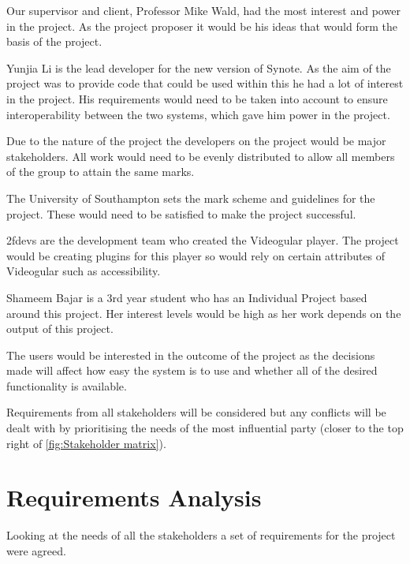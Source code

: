 Our supervisor and client, Professor Mike Wald, had the most interest and power in the project. As the project proposer it would be his ideas that would form the basis of the project.

Yunjia Li is the lead developer for the new version of Synote. As the aim of the project was to provide code that could be used within this he had a lot of interest in the project. His requirements would need to be taken into account to ensure interoperability between the two systems, which gave him power in the project.

Due to the nature of the project the developers on the project would be major stakeholders. All work would need to be evenly distributed to allow all members of the group to attain the same marks.

The University of Southampton sets the mark scheme and guidelines for the project. These would need to be satisfied to make the project successful.

2fdevs are the development team who created the \gls{Videogular} player. The project would be creating plugins for this player so would rely on certain attributes of \gls{Videogular} such as accessibility. 

Shameem Bajar is a 3rd year student who has an Individual Project based around this project. Her interest levels would be high as her work depends on the output of this project. 

The users would be interested in the outcome of the project as the decisions made will affect how easy the system is to use and whether all of the desired functionality is available.

Requirements from all stakeholders will be considered but any conflicts will be dealt with by prioritising the needs of the most influential party (closer to the top right of \autoref{fig:Stakeholder matrix}).

\section{Requirements Analysis}
\label{Section:Requirements Analysis}
Looking at the needs of all the stakeholders a set of requirements for the project were agreed.
